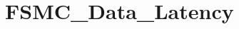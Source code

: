 \hypertarget{group___f_s_m_c___data___latency}{\section{F\-S\-M\-C\-\_\-\-Data\-\_\-\-Latency}
\label{group___f_s_m_c___data___latency}
}
